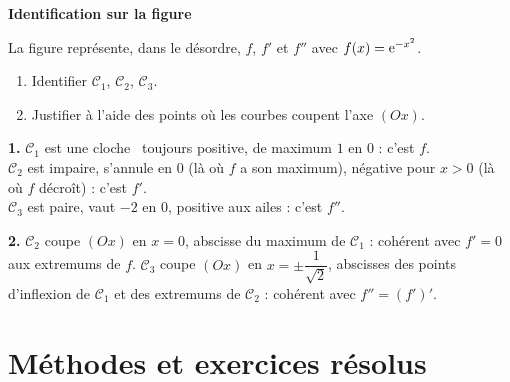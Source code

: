 \exerciceresolu
\textbf{Identification sur la figure}

La figure représente, dans le désordre, $f$, $f'$ et $f''$ avec
$f(x)=\mathrm{e}^{-x^{2}}$.

\begin{center}
\end{center}

\begin{enumerate}
	\item Identifier $\mathcal C_1$, $\mathcal C_2$, $\mathcal C_3$.
	\item Justifier à l'aide des points où les courbes coupent l'axe $(Ox)$.
\end{enumerate}

\solution

\textbf{1.} $\mathcal C_1$ est une \og cloche \fg\ toujours positive, de
maximum $1$ en $0$ : c'est $f$. \\
$\mathcal C_2$ est impaire, s'annule en $0$ (là où $f$ a son maximum),
négative pour $x>0$ (là où $f$ décroît) : c'est $f'$. \\
$\mathcal C_3$ est paire, vaut $-2$ en $0$, positive \og aux ailes \fg :
c'est $f''$.

\textbf{2.} $\mathcal C_2$ coupe $(Ox)$ en $x=0$, abscisse du maximum de
$\mathcal C_1$ : cohérent avec $f'=0$ aux extremums de $f$.
$\mathcal C_3$ coupe $(Ox)$ en $x=\pm\dfrac{1}{\sqrt 2}$, abscisses des
points d'inflexion de $\mathcal C_1$ et des extremums de $\mathcal C_2$ :
cohérent avec $f''=(f')'$.


\section{Méthodes et exercices résolus}

